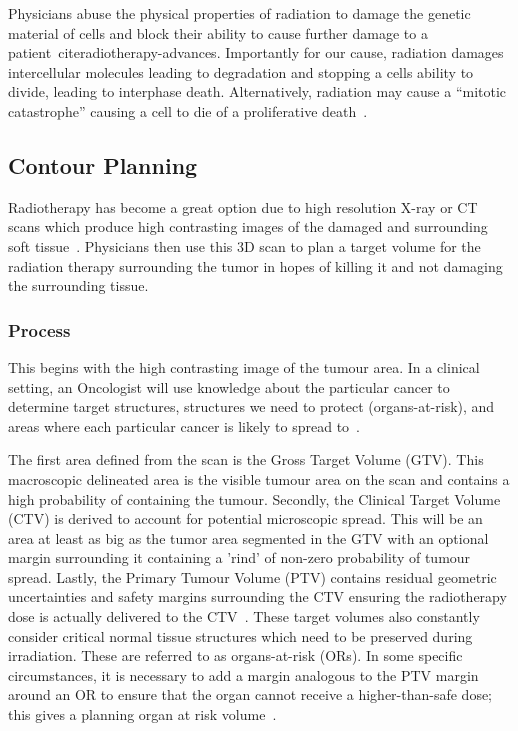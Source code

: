 \documentclass[11pt,twoside]{report}
\begin{document}
Physicians abuse the physical properties of radiation to damage the genetic material of cells and block their ability to cause further damage to a patient~cite{radiotherapy-advances}. Importantly for our cause, radiation damages intercellular molecules leading to degradation and stopping a cells ability to divide, leading to interphase death. Alternatively, radiation may cause a ``mitotic catastrophe'' causing a cell to die of a proliferative death~\cite{cell-death}. 

\subsection{Contour Planning}\label{sect:contour-planning}

Radiotherapy has become a great option due to high resolution X-ray or CT scans which produce high contrasting images of the damaged and surrounding soft tissue~\cite{radiotherapy-basic-concepts}. Physicians then use this 3D scan to plan a target volume for the radiation therapy surrounding the tumor in hopes of killing it and not damaging the surrounding tissue.

\subsubsection{Process}

This begins with the high contrasting image of the tumour area. In a clinical setting, an Oncologist will use knowledge about the particular cancer to determine target structures, structures we need to protect (organs-at-risk), and areas where each particular cancer is likely to spread to~\cite{AMLART-data}. 

The first area defined from the scan is the Gross Target Volume (GTV). This macroscopic delineated area is the visible tumour area on the scan and contains a high probability of containing the tumour. Secondly, the Clinical Target Volume (CTV) is derived to account for potential microscopic spread. This will be an area at least as big as the tumor area segmented in the GTV with an optional margin surrounding it containing a 'rind' of non-zero probability of tumour spread. Lastly, the Primary Tumour Volume (PTV) contains residual geometric uncertainties and safety margins surrounding the CTV ensuring the radiotherapy dose is actually delivered to the CTV~\cite{tumor-delineation,defining-target-volumes,Lin2021-oz,personalised-PTV-strategies}. These target volumes also constantly consider critical normal tissue structures which need to be preserved during irradiation. These are referred to as organs-at-risk (ORs). In some specific circumstances, it is necessary to add a margin analogous to the PTV margin around an OR to ensure that the organ cannot receive a higher-than-safe dose; this gives a planning organ at risk volume~\cite{defining-target-volumes}.
\end{document}
